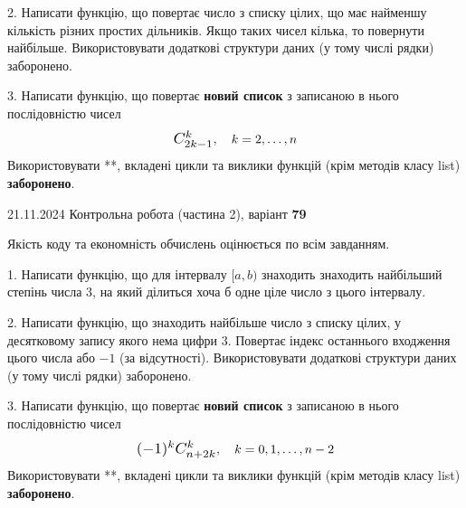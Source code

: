 \documentclass[12pt, ukrainian]{article}
\begin{document}
{{{{{{{{{{{{{{{{{{{\begin {large}
\vspace{10mm}


2. Написати функцію, що повертає число з списку цілих, що має найменшу кількість різних простих дільників. Якщо таких чисел кілька, то повернути найбільше. Використовувати додаткові структури даних (у тому числі рядки) заборонено.

\vspace{10mm}


3. 
Написати функцію, що повертає \textbf{новий список} з записаною в нього послідовністю чисел
$$\scalebox{1.2}{$C_{2k-1}^{k}$}, \quad k=2,\ldots,n$$
Використовувати **, вкладені цикли та виклики функцій (крім методів класу list) \textbf{заборонено}.

\end{large}
\vspace{25mm}


{{21.11.2024 Контрольна робота  (частина 2), варіант  \No \textbf { 79 }\par}}


{
\begin {large}
Якість коду та економність обчислень оцінюється по всім завданням.

\vspace{5mm}

1. Написати функцію, що для інтервалу $[a, b)$ знаходить знаходить найбільший степінь числа 3, на який ділиться хоча б одне ціле число з цього інтервалу.

\vspace{10mm}


2. Написати функцію, що знаходить найбільше число з списку цілих, у десятковому запису якого нема цифри 3. Повертає індекс останнього входження цього числа або $-1$ (за відсутності). Використовувати додаткові структури даних (у тому числі рядки) заборонено.

\vspace{10mm}


3. 
Написати функцію, що повертає \textbf{новий список} з записаною в нього послідовністю чисел
$$\scalebox{1.2}{$(-1)^{k}C_{n+2k}^{k}$}, \quad k=0,1,\ldots,n-2$$
Використовувати **, вкладені цикли та виклики функцій (крім методів класу list) \textbf{заборонено}.


\end{large}}}}}}}}}}}}}}}}}}}}}
\end{document}
